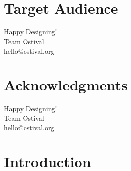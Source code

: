 \documentclass[12pt,oneside,a4paper]{book}
\begin{document}
\chapter*{Target Audience}

\vfill
Happy Designing!\\
Team Ostival\\
hello@ostival.org

\chapter*{Acknowledgments}

\vfill
Happy Designing!\\
Team Ostival\\
hello@ostival.org

\mainmatter

\chapter{Introduction}

\backmatter
 
 
\end{document}
